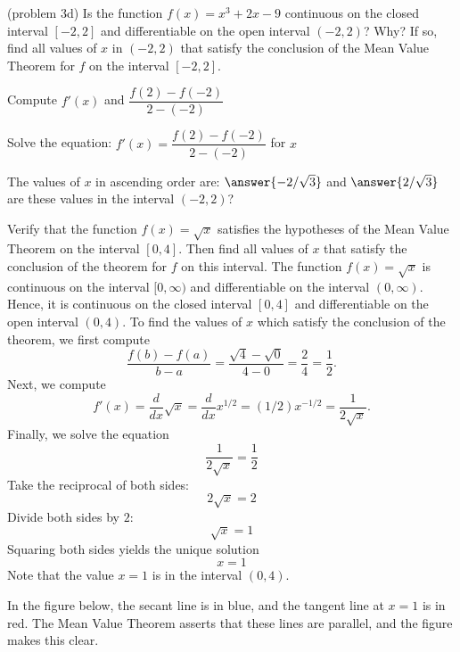 \documentclass[handout]{ximera}
\begin{document}
\begin{problem}(problem 3d)
  Is the function $f(x) = x^3 + 2x -9$ continuous on the closed interval $[-2,2]$ and differentiable on the open interval $(-2,2)$? Why?
  If so, find all values of $x$ in $(-2,2)$ that satisfy the conclusion of the Mean Value Theorem for $f$ on the interval $[-2,2]$.
  	
    \begin{hint}
      Compute $f'(x)$ and $\dfrac{f(2) - f(-2)}{2-(-2)}$
    \end{hint}
		\begin{hint}
		  Solve the equation: $f'(x) = \dfrac{f(2) - f(-2)}{2-(-2)}$ for $x$
		\end{hint}
		
		The values of $x$ in ascending order are:
		 $\answer{-2/\sqrt 3}$ and $\answer{2/\sqrt 3}$
     are these values in the interval $(-2,2)$?
\end{problem}




\begin{example}[example 4]
Verify that the function $f(x) = \sqrt x$ satisfies the hypotheses of the Mean Value Theorem
on the interval $[0,4]$. Then find all values of $x$ that satisfy the conclusion of the theorem for $f$ on this interval.
The function $f(x) = \sqrt x$ is continuous on the interval $[0, \infty)$  and differentiable on the interval $(0, \infty)$. 
Hence, it is continuous on the closed interval $[0, 4]$ and differentiable on the open interval $(0, 4)$. 
To find the values of $x$ which satisfy the conclusion of the theorem, we first compute
\[\frac{f(b) - f(a)}{b-a} = \frac{\sqrt 4 - \sqrt 0}{4-0} = \frac{2}{4} = \frac{1}{2}.\]
Next, we compute
\[f'(x) = \frac{d}{dx} \sqrt x = \frac{d}{dx} x^{1/2} = (1/2)x^{-1/2} = \frac{1}{2\sqrt x}.\]
Finally, we solve the equation
\[\frac{1}{2\sqrt x} = \frac{1}{2}\]
Take the reciprocal of both sides:
\[2\sqrt x = 2\]
Divide both sides by $2$: 
\[\sqrt x = 1\]
Squaring both sides yields the unique solution
\[ x=1\]
Note that the value $x = 1$ is in the interval $(0,4)$.

In the figure below, the secant line is in blue, 
and the tangent line at $x = 1$ is in red. The Mean Value Theorem asserts that these lines are parallel, and the figure makes this clear.

\begin{image}
\end{image}


\end{example}
\end{document}
